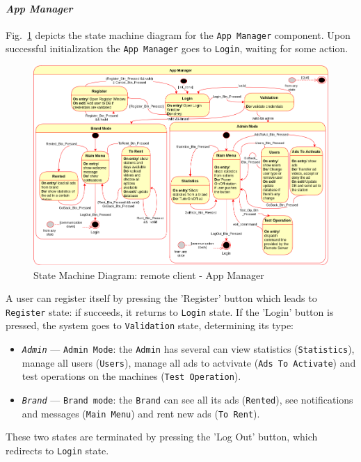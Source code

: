 \paragraph{\emph{App Manager}}
Fig.~\ref{fig:state-mach-rc-app-manag} depicts the state machine diagram for the
\texttt{App Manager} component.
Upon successful initialization the
\texttt{App Manager} goes to \texttt{Login}, waiting for some action. 
%
\begin{figure}[htb!]
\centering
    \includegraphics[width=0.9\columnwidth]{./img/state-mach-rc-app-manag.png}
  \caption{State Machine Diagram: remote client - App Manager}%
\label{fig:state-mach-rc-app-manag}
\end{figure}
%

A user can register itself by pressing the 'Register' button which leads to \texttt{Register} state: if succeeds, it returns to \texttt{Login} state. 
If the 'Login' button is pressed, the system goes to \texttt{Validation} state,
determining its type:
\begin{itemize}
\item \emph{\texttt{Admin}} --- \texttt{Admin Mode}: the \texttt{Admin} has several can
  view statistics (\texttt{Statistics}), manage all users (\texttt{Users}),
  manage all ads to actvivate (\texttt{Ads To Activate}) and test operations on
  the machines (\texttt{Test Operation}).
\item \emph{\texttt{Brand}} --- \texttt{Brand mode}: the \texttt{Brand} can see all its ads (\texttt{Rented}), see notifications and messages (\texttt{Main Menu}) and rent new ads (\texttt{To Rent}). 
\end{itemize}
%
These two states are terminated by pressing the 'Log Out' button, which
redirects to \texttt{Login} state.

